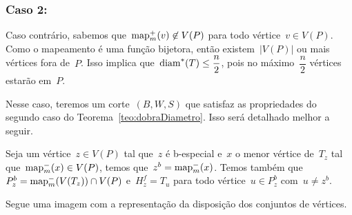 	\bigskip
	\bigskip

		\subsubsection*{Caso 2:}
			Caso contrário, sabemos que~${\mathrm{map}_m^+(v)\not\in V(P)}$ 
			para todo vértice~${v\in V(P)}$.
			Como o mapeamento é uma função bijetora, 
			então existem~$|V(P)|$ ou mais vértices fora de~$P$.
			Isso implica que~$\mathrm{diam}^*(T)\le\dfrac{n}{2}$, pois no 
			máximo~$\dfrac{n}{2}$ vértices estarão em~$P$.

			Nesse caso, teremos um corte~$(B,W,S)$ que satisfaz as
			propriedades do segundo caso do Teorema~\ref{teo:dobraDiametro}.
			Isso será detalhado melhor a seguir.

			\bigskip
			

			Seja um vértice~${z\in V(P)}$ tal que~$z$ é b-especial 
			e~$x$ o menor vértice de~$T_z$ tal 
			que~${\mathrm{map}^-_m(x)\in V(P)}$, temos 
			que~${z^b = \mathrm{map}^-_m(x)}$.
			Temos também
			que~${P_z^b = \mathrm{map}^-_m(V(T_z))\cap V(P)}$
			e~${H_z^f =T_u}$ para todo 
			vértice~${u\in P_z^b}$ com~${u\ne z^b}$.

			Segue uma imagem com a representação da disposição dos 
			conjuntos de vértices.

